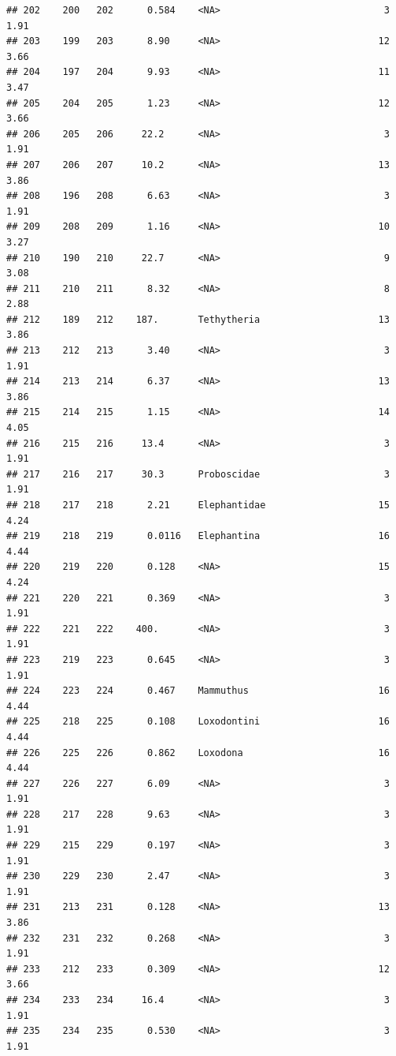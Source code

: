 \documentclass[10pt,letterpaper]{article}
\begin{document}
\begin{verbatim}
## 202    200   202      0.584    <NA>                             3    1.91 
## 203    199   203      8.90     <NA>                            12    3.66 
## 204    197   204      9.93     <NA>                            11    3.47 
## 205    204   205      1.23     <NA>                            12    3.66 
## 206    205   206     22.2      <NA>                             3    1.91 
## 207    206   207     10.2      <NA>                            13    3.86 
## 208    196   208      6.63     <NA>                             3    1.91 
## 209    208   209      1.16     <NA>                            10    3.27 
## 210    190   210     22.7      <NA>                             9    3.08 
## 211    210   211      8.32     <NA>                             8    2.88 
## 212    189   212    187.       Tethytheria                     13    3.86 
## 213    212   213      3.40     <NA>                             3    1.91 
## 214    213   214      6.37     <NA>                            13    3.86 
## 215    214   215      1.15     <NA>                            14    4.05 
## 216    215   216     13.4      <NA>                             3    1.91 
## 217    216   217     30.3      Proboscidae                      3    1.91 
## 218    217   218      2.21     Elephantidae                    15    4.24 
## 219    218   219      0.0116   Elephantina                     16    4.44 
## 220    219   220      0.128    <NA>                            15    4.24 
## 221    220   221      0.369    <NA>                             3    1.91 
## 222    221   222    400.       <NA>                             3    1.91 
## 223    219   223      0.645    <NA>                             3    1.91 
## 224    223   224      0.467    Mammuthus                       16    4.44 
## 225    218   225      0.108    Loxodontini                     16    4.44 
## 226    225   226      0.862    Loxodona                        16    4.44 
## 227    226   227      6.09     <NA>                             3    1.91 
## 228    217   228      9.63     <NA>                             3    1.91 
## 229    215   229      0.197    <NA>                             3    1.91 
## 230    229   230      2.47     <NA>                             3    1.91 
## 231    213   231      0.128    <NA>                            13    3.86 
## 232    231   232      0.268    <NA>                             3    1.91 
## 233    212   233      0.309    <NA>                            12    3.66 
## 234    233   234     16.4      <NA>                             3    1.91 
## 235    234   235      0.530    <NA>                             3    1.91 

\end{verbatim}
\end{document}

